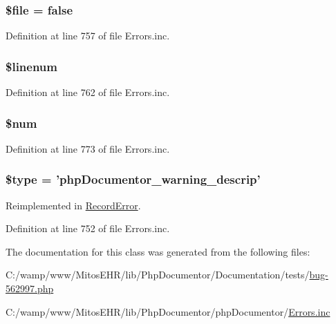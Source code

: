 \hypertarget{class_record_warning_aa1bfbd27060176201b271918dff57e8f}{
\subsubsection[{\$file}]{\setlength{\rightskip}{0pt plus 5cm}\$file = false}}\label{class_record_warning_aa1bfbd27060176201b271918dff57e8f}


\-Definition at line 757 of file \-Errors.\-inc.

\hypertarget{class_record_warning_a597bef7e50a56c650cf17a1ed6bc5595}{
\subsubsection[{\$linenum}]{\setlength{\rightskip}{0pt plus 5cm}\$linenum}}\label{class_record_warning_a597bef7e50a56c650cf17a1ed6bc5595}


\-Definition at line 762 of file \-Errors.\-inc.

\hypertarget{class_record_warning_a606c9dff2aade84f01338c3c4cd8016b}{
\subsubsection[{\$num}]{\setlength{\rightskip}{0pt plus 5cm}\$num}}\label{class_record_warning_a606c9dff2aade84f01338c3c4cd8016b}


\-Definition at line 773 of file \-Errors.\-inc.

\hypertarget{class_record_warning_a9a4a6fba2208984cabb3afacadf33919}{
\subsubsection[{\$type}]{\setlength{\rightskip}{0pt plus 5cm}\$type = 'php\-Documentor\-\_\-warning\-\_\-descrip'}}\label{class_record_warning_a9a4a6fba2208984cabb3afacadf33919}


\-Reimplemented in \hyperlink{class_record_error_a9a4a6fba2208984cabb3afacadf33919}{\-Record\-Error}.



\-Definition at line 752 of file \-Errors.\-inc.



\-The documentation for this class was generated from the following files\-:\begin{DoxyCompactItemize}
\item 
\-C\-:/wamp/www/\-Mitos\-E\-H\-R/lib/\-Php\-Documentor/\-Documentation/tests/\hyperlink{bug-562997_8php}{bug-\/562997.\-php}\item 
\-C\-:/wamp/www/\-Mitos\-E\-H\-R/lib/\-Php\-Documentor/php\-Documentor/\hyperlink{_errors_8inc}{\-Errors.\-inc}\end{DoxyCompactItemize}
